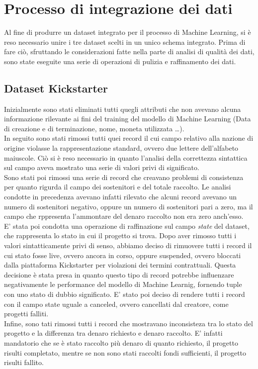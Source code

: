 \section{Processo di integrazione dei dati}
Al fine di produrre un dataset integrato per il processo di Machine Learning, si è reso necessario unire i tre dataset scelti in un unico schema integrato. Prima di fare ciò, sfruttando le considerazioni fatte nella parte di analisi di qualità dei dati, sono state eseguite una serie di operazioni di pulizia e raffinamento dei dati.\\
\subsection{Dataset Kickstarter}
Inizialmente sono stati eliminati tutti quegli attributi che non avevano alcuna informazione rilevante ai fini del training del modello di Machine Learning (Data di creazione e di terminazione, nome, moneta utilizzata \dots).\\
In seguito sono stati rimossi tutti quei record il cui campo relativo alla nazione di origine violasse la rappresentazione standard, ovvero due lettere dell'alfabeto maiuscole. Ciò si è reso necessario in quanto l'analisi della correttezza sintattica sul campo aveva mostrato una serie di valori privi di significato.\\
Sono stati poi rimossi una serie di record che creavano problemi di consistenza per quanto rigurda il campo dei sostenitori e del totale raccolto. Le analisi condotte in precedenza avevano infatti rilevato che alcuni record avevano un numero di sostenitori negativo, oppure un numero di sostenitori pari a zero, ma il campo che rppresenta l'ammontare del denaro raccolto non era zero anch'esso.\\
E' stata poi condotta una operazione di raffinazione sul campo \textit{state} del dataset, che rappresenta lo stato in cui il progetto si trova. Dopo aver rimosso tutti i valori sintatticamente privi di senso, abbiamo deciso di rimuovere tutti i record il cui stato fosse live, ovvero ancora in corso, oppure suspended, ovvero bloccati dalla piattaforma Kickstarter per violazioni dei termini contrattuali. Questa decisione è stata presa in quanto questo tipo di record potrebbe influenzare negativamente le performance del modello di Machine Learnig, fornendo tuple con uno stato di dubbio significato.
E' stato poi deciso di rendere tutti i record con il campo state uguale a canceled, ovvero cancellati dal creatore, come progetti falliti.\\
Infine, sono tati rimossi tutti i record che mostravano inconsisteza tra lo stato del progetto e la differenza tra denaro richiesto e denaro raccolto. E' infatti mandatorio che se è stato raccolto più denaro di quanto richiesto, il progetto risulti completato, mentre se non sono stati raccolti fondi sufficienti, il progetto risulti fallito.\\

